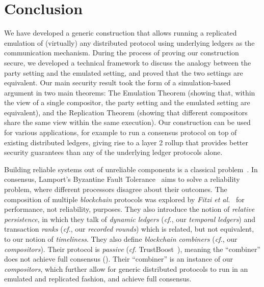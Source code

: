 \section{Conclusion}

\myparagraph[Summary]
We have developed a generic construction that allows running a replicated emulation
of (virtually) any distributed protocol using underlying ledgers as the communication
mechanism. During the process of proving our construction secure, we developed a
technical framework to discuss the analogy between the party setting and the emulated
setting, and proved that the two settings are equivalent.
Our main security result took the form of a simulation-based argument in two main theorems:
The Emulation Theorem (showing that, within the view of a single compositor, the party
setting and the emulated setting are equivalent), and the Replication Theorem (showing that
different compositors share the same view within the same execution). Our construction
can be used for various applications, for example to run a consensus protocol on top
of existing distributed ledgers, giving rise to a layer 2 rollup that provides better
security guarantees than any of the underlying ledger protocols alone.

Building reliable systems out of unreliable components
is a classical problem~\cite{von1956probabilistic,moore1956reliable}.
In consensus, Lamport's Byzantine Fault Tolerance~\cite{shostak1982byzantine}
aims to solve a reliability problem, where different processors disagree about their
outcomes. The composition of multiple \emph{blockchain} protocols was explored by
\emph{Fitzi et al.}~\cite{combiners} for performance,
not reliability, purposes. They also introduce the notion of
\emph{relative persistence}, in which they talk of \emph{dynamic ledgers} (\emph{cf.}, our
\emph{temporal ledgers}) and transaction \emph{ranks} (\emph{cf.}, our \emph{recorded rounds})
which is related, but not equivalent, to our notion of \emph{timeliness}.
They also define \emph{blockchain combiners} (\emph{cf.}, our \emph{compositors}).
Their protocol is \emph{passive} (\emph{cf.} TrustBoost~\cite{trustboost}),
meaning the ``combiner'' does not achieve full consensus (\cite[Section 5]{combiners}).
Their ``combiner'' is an instance of our \emph{compositors}, which
further allow for generic distributed protocols to run in an emulated and
replicated fashion, and achieve full consensus.

